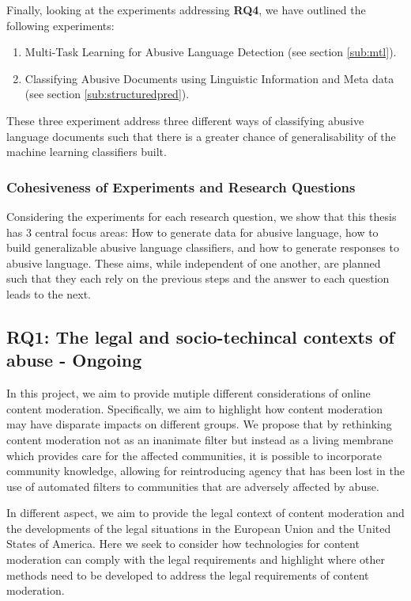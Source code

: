 Finally, looking at the experiments addressing {\bf RQ4}, we have outlined the following experiments:
\begin{enumerate}
  \item{Multi-Task Learning for Abusive Language Detection (see section \autoref{sub:mtl}).}
  \item{Classifying Abusive Documents using Linguistic Information and Meta data (see section \autoref{sub:structuredpred}).}
\end{enumerate}
These three experiment address three different ways of classifying abusive language documents such that there is a greater chance of generalisability of the machine learning classifiers built.\vspace{5mm}

\subsubsection{Cohesiveness of Experiments and Research Questions}
\noindent Considering the experiments for each research question, we show that this thesis has 3 central focus areas: How to generate data for abusive language, how to build generalizable abusive language classifiers, and how to generate responses to abusive language. These aims, while independent of one another, are planned such that they each rely on the previous steps and the answer to each question leads to the next.

\subsection{RQ1: The legal and socio-techincal contexts of abuse - Ongoing}\label{sub:sociotech}
In this project, we aim to provide mutiple different considerations of online content moderation. Specifically, we aim to highlight how content moderation may have disparate impacts on different groups. We propose that by rethinking content moderation not as an inanimate filter but instead as a living membrane which provides care for the affected communities, it is possible to incorporate community knowledge, allowing for reintroducing agency that has been lost in the use of automated filters to communities that are adversely affected by abuse.

In different aspect, we aim to provide the legal context of content moderation and the developments of the legal situations in the European Union and the United States of America. Here we seek to consider how technologies for content moderation can comply with the legal requirements and highlight where other methods need to be developed to address the legal requirements of content moderation.

